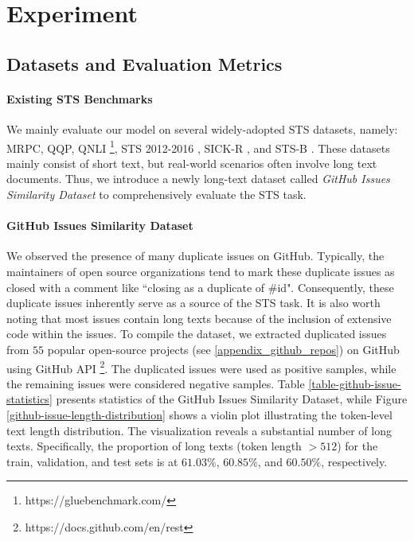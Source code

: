\documentclass{article} \usepackage{iclr2024_conference,times}
\begin{document}
\section{Experiment}



\subsection{Datasets and Evaluation Metrics}
\paragraph{Existing STS Benchmarks} We mainly evaluate our model on several widely-adopted STS datasets, namely: MRPC, QQP, QNLI \footnote{https://gluebenchmark.com/}, STS 2012-2016 \citep{agirre-etal-2012-semeval, agirre-etal-2013-semeval, agirre-etal-2014-semeval, agirre-etal-2015-semeval, agirre-etal-2016-semeval}, SICK-R \citep{marelli-etal-2014-sick}, and STS-B \citep{cer-etal-2017-semeval}. These datasets mainly consist of short text, but real-world scenarios often involve long text documents. Thus, we introduce a newly long-text dataset called \textit{GitHub Issues Similarity Dataset} to comprehensively evaluate the STS task. 

\paragraph{GitHub Issues Similarity Dataset}
We observed the presence of many duplicate issues on GitHub. Typically, the maintainers of open source organizations tend to mark these duplicate issues as closed with a comment like ``closing as a duplicate of \#id". Consequently, these duplicate issues inherently serve as a source of the STS task. It is also worth noting that most issues contain long texts because of the inclusion of extensive code within the issues.
To compile the dataset, we extracted duplicated issues from $55$ popular open-source projects (see \ref{appendix_github_repos}) on GitHub using GitHub API \footnote{https://docs.github.com/en/rest}. The duplicated issues were used as positive samples, while the remaining issues were considered negative samples. Table \ref{table-github-issue-statistics} presents statistics of the GitHub Issues Similarity Dataset, while Figure \ref{github-issue-length-distribution} shows a violin plot illustrating the token-level text length distribution. The visualization reveals a substantial number of long texts. Specifically, the proportion of long texts (token length $> 512$)  for the train, validation, and test sets is at $61.03\%$, $60.85\%$, and $60.50\%$, respectively.
\end{document}
